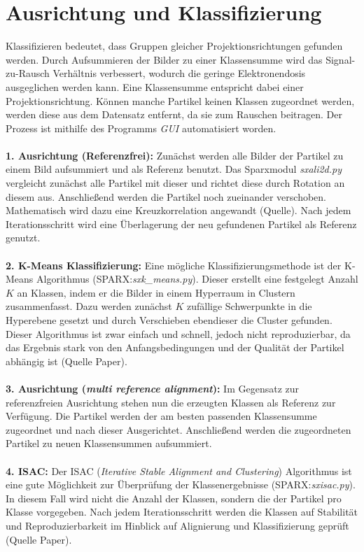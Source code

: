 \section{Ausrichtung und Klassifizierung} %
\label{sec:klassifizierung}

Klassifizieren bedeutet, dass Gruppen gleicher Projektionsrichtungen gefunden werden.
Durch Aufsummieren der Bilder zu einer Klassensumme wird das Signal-zu-Rausch Verhältnis verbessert, wodurch die geringe Elektronendosis ausgeglichen werden kann.
Eine Klassensumme entspricht dabei einer Projektionsrichtung.
Können manche Partikel keinen Klassen zugeordnet werden, werden diese aus dem Datensatz entfernt, da sie zum Rauschen beitragen.
Der Prozess ist mithilfe des Programms \textit{GUI} automatisiert worden.
\\
\\
\textbf{1. Ausrichtung (Referenzfrei):}
Zunächst werden alle Bilder der Partikel zu einem Bild aufsummiert und als Referenz benutzt.
Das Sparxmodul \textit{sxali2d.py} vergleicht zunächst alle Partikel mit dieser und richtet diese durch Rotation an diesem aus.
Anschließend werden die Partikel noch zueinander verschoben.
Mathematisch wird dazu eine Kreuzkorrelation angewandt (Quelle).
Nach jedem Iterationsschritt wird eine Überlagerung der neu gefundenen Partikel als Referenz genutzt.
\\
\\
\textbf{2. K-Means Klassifizierung:}
Eine mögliche Klassifizierungsmethode ist der K-Means Algorithmus (SPARX:\textit{sxk\_means.py}).
Dieser erstellt eine festgelegt Anzahl $K$ an Klassen, indem er die Bilder in einem Hyperraum in Clustern zusammenfasst.
Dazu werden zunächst $K$ zufällige Schwerpunkte in die Hyperebene gesetzt und durch Verschieben ebendieser die Cluster gefunden.
Dieser Algorithmus ist zwar einfach und schnell, jedoch nicht reproduzierbar, da das Ergebnis stark von den Anfangsbedingungen und der Qualität der Partikel abhängig ist (Quelle Paper).
\\ 
\\
\textbf{3. Ausrichtung (\textit{multi reference alignment}):}
Im Gegensatz zur referenzfreien Ausrichtung stehen nun die erzeugten Klassen als Referenz zur Verfügung.
Die Partikel werden der am besten passenden Klassensumme zugeordnet und nach dieser Ausgerichtet.
Anschließend werden die zugeordneten Partikel zu neuen Klassensummen aufsummiert.
\\ 
\\
\textbf{4. ISAC:}
Der ISAC (\textit{Iterative Stable Alignment and Clustering}) Algorithmus ist eine gute Möglichkeit zur Überprüfung der Klassenergebnisse (SPARX:\textit{sxisac.py}).
In diesem Fall wird nicht die Anzahl der Klassen, sondern die der Partikel pro Klasse vorgegeben.
Nach jedem Iterationsschritt werden die Klassen auf Stabilität und Reproduzierbarkeit im Hinblick auf Alignierung und Klassifizierung geprüft (Quelle Paper).

\FloatBarrier